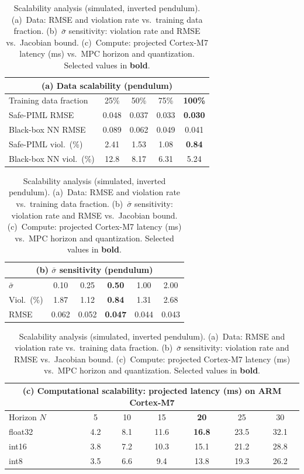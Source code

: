 \documentclass[12pt,a4paper]{article}
\begin{document}
\begin{table}[t]
  \centering\small
  \caption{Scalability analysis (simulated, inverted pendulum).
  (a)~Data: RMSE and violation rate vs.\ training data fraction.
  (b)~$\bar\sigma$ sensitivity: violation rate and RMSE vs.\ Jacobian
  bound. (c)~Compute: projected Cortex-M7 latency (ms) vs.\ MPC
  horizon and quantization. Selected values in \textbf{bold}.}
  \label{tab:scalability}
  \begin{tabular*}{\textwidth}{@{\extracolsep{\fill}}lcccc}
    \toprule
    \multicolumn{5}{c}{\textbf{(a) Data scalability (pendulum)}} \\
    \midrule
    Training data fraction & 25\% & 50\% & 75\% & \textbf{100\%} \\
    \midrule
    Safe-PIML RMSE & 0.048 & 0.037 & 0.033 & \textbf{0.030} \\
    Black-box NN RMSE & 0.089 & 0.062 & 0.049 & 0.041 \\
    Safe-PIML viol.\ (\%) & 2.41 & 1.53 & 1.08 & \textbf{0.84} \\
    Black-box NN viol.\ (\%) & 12.8 & 8.17 & 6.31 & 5.24 \\
    \bottomrule
  \end{tabular*}
  \vspace{4pt}
  \begin{tabular*}{\textwidth}{@{\extracolsep{\fill}}lccccc}
    \toprule
    \multicolumn{6}{c}{\textbf{(b) $\bar\sigma$ sensitivity (pendulum)}} \\
    \midrule
    $\bar\sigma$ & 0.10 & 0.25 & \textbf{0.50} & 1.00 & 2.00 \\
    \midrule
    Viol.\ (\%) & 1.87 & 1.12 & \textbf{0.84} & 1.31 & 2.68 \\
    RMSE & 0.062 & 0.052 & \textbf{0.047} & 0.044 & 0.043 \\
    \bottomrule
  \end{tabular*}
  \vspace{4pt}
  \begin{tabular*}{\textwidth}{@{\extracolsep{\fill}}lcccccc}
    \toprule
    \multicolumn{7}{c}{\textbf{(c) Computational scalability:
    projected latency (ms) on ARM Cortex-M7}} \\
    \midrule
    Horizon $N$ & 5 & 10 & 15 & \textbf{20} & 25 & 30 \\
    \midrule
    float32 & 4.2 & 8.1 & 11.6 & \textbf{16.8} & 23.5 & 32.1 \\
    int16   & 3.8 & 7.2 & 10.3 & 15.1 & 21.2 & 28.8 \\
    int8    & 3.5 & 6.6 & 9.4  & 13.8 & 19.3 & 26.2 \\
    \bottomrule
  \end{tabular*}
\end{table}
\end{document}
